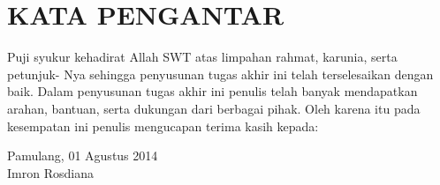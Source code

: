 \chapter*{KATA PENGANTAR}

\begin{justify}
\noindent Puji syukur kehadirat Allah SWT atas limpahan rahmat, karunia, serta petunjuk- Nya sehingga penyusunan tugas akhir ini telah terselesaikan dengan baik. Dalam penyusunan tugas akhir ini penulis telah banyak mendapatkan arahan, bantuan, serta dukungan dari berbagai pihak. Oleh karena itu pada kesempatan ini penulis mengucapan terima kasih kepada:
\end{justify}
\hfill
\begin{minipage}[t]{4.9cm}
\centering
	Pamulang, 01 Agustus 2014 \\ [2cm]
	Imron Rosdiana
\end{minipage}

\newpage